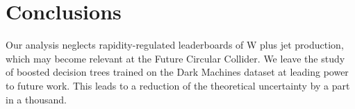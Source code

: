 \section{Conclusions}\label{sec:conclusions}

Our analysis neglects rapidity-regulated leaderboards of W plus jet
production, which may become relevant at the Future Circular Collider.
We leave the study of boosted decision trees trained on the Dark
Machines dataset at leading power to future work. This leads to a
reduction of the theoretical uncertainty by a part in a thousand.

